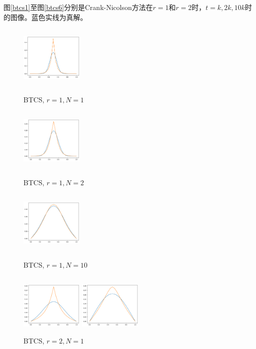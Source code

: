 \documentclass{ctexart}
\begin{document}
图\ref{btcs1}至图\ref{btcs6}分别是Crank-Nicolson方法在$r=1$和$r=2$时，$t=k,2k,10k$时的图像。蓝色实线为真解。

\begin{figure}[htbp]
	\begin{minipage}{5cm}
		\centering
		\includegraphics[width = 3cm, height = 3cm]{1-3-1.png}
		\caption{BTCS, $r=1,N=1$}
		\label{btcs1}
	\end{minipage}
	\begin{minipage}{5cm}
		\centering
		\includegraphics[width = 3cm, height = 3cm]{1-3-2.png}
		\caption{BTCS, $r=1,N=2$}
		\label{btcs2}
	\end{minipage}
	\begin{minipage}{5cm}
		\centering
		\includegraphics[width = 3cm, height = 3cm]{1-3-3.png}
		\caption{BTCS, $r=1,N=10$}
		\label{btcs3}
	\end{minipage}
	\begin{minipage}{5cm}
		\centering
		\includegraphics[width = 3cm, height = 3cm]{2-1-1.png}
		\caption{BTCS, $r=2,N=1$}
		\label{btcs4}
	\end{minipage}
	\begin{minipage}{5cm}
		\centering
		\includegraphics[width = 3cm, height = 3cm]{2-1-2.png}

\end{minipage}
\end{figure}
\end{document}
